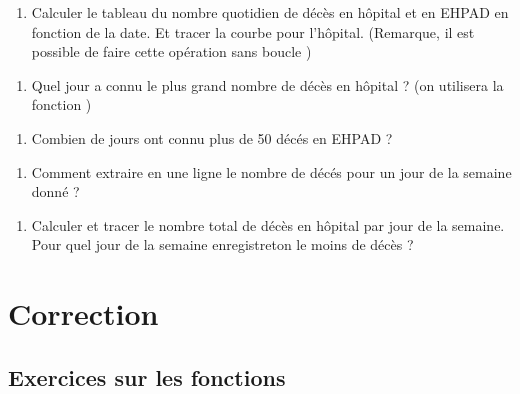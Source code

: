 \documentclass[letterpaper,10pt,english]{sphinxhowto}
\begin{document}
\begin{enumerate}
%
\setcounter{enumi}{5}
\item {} 
\sphinxAtStartPar
Calculer le tableau du nombre quotidien de décès en hôpital et en EHPAD en fonction de la date. Et tracer la courbe pour l’hôpital. (Remarque, il est possible de faire cette opération sans boucle )

\end{enumerate}
\begin{enumerate}
%
\setcounter{enumi}{6}
\item {} 
\sphinxAtStartPar
Quel jour a connu le plus grand nombre de décès en hôpital ? (on utilisera la fonction )

\end{enumerate}
\begin{enumerate}
%
\setcounter{enumi}{7}
\item {} 
\sphinxAtStartPar
Combien de jours ont connu plus de 50 décés en EHPAD ?

\end{enumerate}
\begin{enumerate}
%
\setcounter{enumi}{8}
\item {} 
\sphinxAtStartPar
Comment extraire en une ligne le nombre de décés pour un jour de la semaine donné ?

\end{enumerate}
\begin{enumerate}
%
\setcounter{enumi}{9}
\item {} 
\sphinxAtStartPar
Calculer et tracer le nombre total de décès en hôpital par jour de la semaine. Pour quel jour de la semaine enregistre\sphinxhyphen{}t\sphinxhyphen{}on le moins de décès ?

\end{enumerate}


\section{Correction}
\label{\detokenize{correction:correction}}\label{\detokenize{correction::doc}}

\subsection{Exercices sur les fonctions}
\label{\detokenize{cours1_fonctions_corr_exercices:exercices-sur-les-fonctions}}\label{\detokenize{cours1_fonctions_corr_exercices::doc}}
\end{document}
